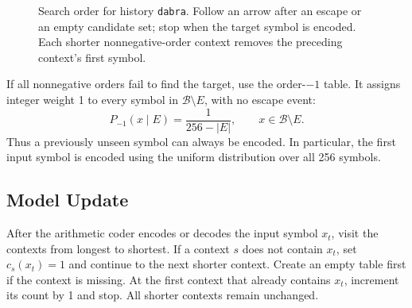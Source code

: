 \documentclass[12pt,onecolumn]{article}
\newcommand{\byte}[1]{\texttt{#1}}
\begin{document}
\begin{figure}[htbp]
\centering
{}
\caption{Search order for history \byte{dabra}. Follow an arrow after an escape
or an empty candidate set; stop when the target symbol is encoded. Each shorter
nonnegative-order context removes the preceding context's first symbol.}
\label{fig:backoff}
\end{figure}

If all nonnegative orders fail to find the target, use the order-$-1$ table. It assigns integer
weight 1 to every symbol in $\mathcal{B}\setminus E$, with no escape event:
\begin{equation}
  P_{-1}(x\mid E)=\frac{1}{256-|E|},
  \qquad x\in\mathcal{B}\setminus E.
\end{equation}
Thus a previously unseen symbol can always be encoded. In particular, the first
input symbol is encoded using the uniform distribution over all 256 symbols.

\subsection{Model Update}
\label{sec:model-update}

After the arithmetic coder encodes or decodes the input symbol $x_t$,
visit the contexts from longest to shortest.
If a context $s$ does not contain $x_t$, set $c_s(x_t)=1$ and continue
to the next shorter context. Create an empty table first if the context is
missing. At the first context that already contains $x_t$, increment its count
by 1 and stop. All shorter contexts remain unchanged.
\end{document}

